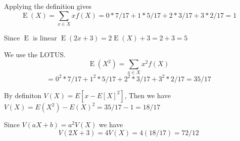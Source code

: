\documentclass[11pt,largemargins]{homework}
\newcommand{\E}{\operatorname{E}}
\begin{document}
\maketitle
\question
\begin{alphaparts}
\questionpart
Applying the definition gives
\[\E(X) = \displaystyle \sum_{x \in X} xf(X) = 0 * 7/17 + 1 * 5/17 + 2*3/17 + 3*2/17 = 1 \]

\questionpart
Since $\E$ is linear
$\E(2x + 3) = 2\E(X) + 3 = 2 + 3 = 5$

\questionpart
We use the LOTUS. 
\[\E(X^2) = \displaystyle \sum_{x \in X} x^2 f(X) \]
\[= 0^2 * 7/17 + 1^2 * 5/17 + 2^2 *3/17 + 3^2 *2/17= 35/17 \]

\questionpart
By definiton $V(X) = E[x - E[X]^2]$, Then we have $V(X) = E(X^2) - E(X)^2 = 35/17 - 1 = 18/17$

\questionpart 
Since $V(aX + b) = a^2V(X)$ we have 
\[V(2X + 3) = 4V(X) = 4(18/17) = 72/12 \]

\end{alphaparts}


\end{document}
